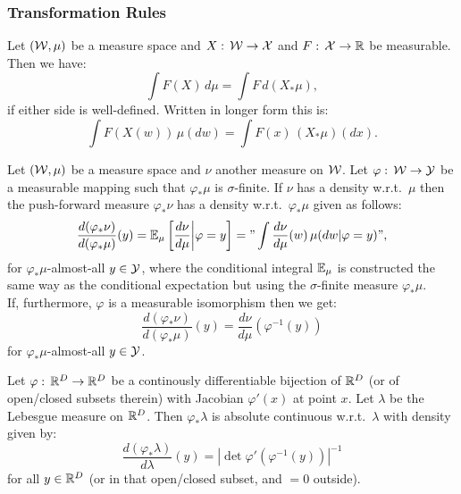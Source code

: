 \subsubsection{Transformation Rules}


\begin{Thm}
    Let $(\mathcal{W},\mu)$ be a measure space and $X :\,\mathcal{W} \to \mathcal{X}$ and $F:\, \mathcal{X} \to \mathbb{R}$ be measurable.
    Then we have:
    \[ \int F(X)\,d\mu = \int F\, d(X_*\mu),  \]
    if either side is well-defined.
    Written in longer form this is:
    \[ \int F(X(w))\,\mu(dw) = \int F(x)\, (X_*\mu)(dx).  \]
\end{Thm}



\begin{Thm}
    Let $(\mathcal{W},\mu)$ be a  measure space and $\nu$ another measure on $\mathcal{W}$. Let $\varphi:\,\mathcal{W} \to \mathcal{Y}$ be a measurable mapping such that 
    $\varphi_*\mu$ is $\sigma$-finite.
    If $\nu$ has a density w.r.t.\ $\mu$ then the push-forward measure $\varphi_*\nu$ has a density w.r.t.\ $\varphi_*\mu$ given as follows:
    \[ \frac{d(\varphi_*\nu)}{d(\varphi_*\mu)}(y) = \mathbb{E}_\mu\left [ \frac{d\nu}{d\mu} \bigg| \varphi=y\right ]  = "\int \frac{d\nu}{d\mu}(w) \, \mu(dw|\varphi=y)", \]
    for $\varphi_*\mu$-almost-all $y \in \mathcal{Y}$,  where the conditional integral $\mathbb{E}_\mu$  is constructed 
    the same way as the conditional expectation but using the $\sigma$-finite measure $\varphi_*\mu$.\\
    If, furthermore, $\varphi$ is a measurable isomorphism then we get: 
    \[ \frac{d(\varphi_*\nu)}{d(\varphi_*\mu)}(y) = \frac{d\nu}{d\mu}(\varphi^{-1}(y)) \]
     for $\varphi_*\mu$-almost-all $y \in \mathcal{Y}$.
\end{Thm}

\begin{Thm}
    \label{transformation-formula}
    Let $\varphi:\, \mathbb{R}^D \to \mathbb{R}^D$ be a continously differentiable bijection of $\mathbb{R}^D$ (or of open/closed subsets therein) with Jacobian $\varphi'(x)$ at point $x$. 
    Let $\lambda$ be the Lebesgue measure on $\mathbb{R}^D$.
    Then $\varphi_* \lambda$ is absolute continuous w.r.t.\ $\lambda$ with density given by:
    \[ \frac{d (\varphi_*\lambda)}{d\lambda}(y) = | \det \varphi' (\varphi^{-1}(y))|^{-1}  \]
    for all $y \in \mathbb{R}^D$ (or in that open/closed subset, and $=0$ outside).
\end{Thm}


